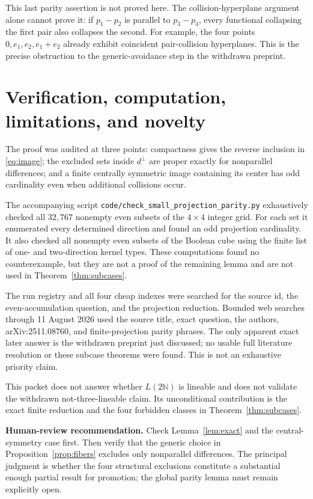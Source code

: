 \documentclass[11pt]{article}
\newcommand{\N}{\mathbb N}
\begin{document}
This last parity assertion is not proved here.  The collision-hyperplane
argument alone cannot prove it: if $p_1-p_2$ is parallel to $p_3-p_4$, every
functional collapsing the first pair also collapses the second.  For example,
the four points $0,e_1,e_2,e_1+e_2$ already exhibit coincident pair-collision
hyperplanes.  This is the precise obstruction to the generic-avoidance step
in the withdrawn preprint.

\section{Verification, computation, limitations, and novelty}

The proof was audited at three points: compactness gives the reverse inclusion
in \eqref{eq:image}; the excluded sets inside $d^\perp$ are proper exactly for
nonparallel differences; and a finite centrally symmetric image containing
its center has odd cardinality even when additional collisions occur.

The accompanying script \texttt{code/check\_small\_projection\_parity.py}
exhaustively checked all $32{,}767$ nonempty even subsets of the $4\times4$
integer grid.  For each set it enumerated every determined direction and
found an odd projection cardinality.  It also checked all nonempty even
subsets of the Boolean cube using the finite list of one- and two-direction
kernel types.  These computations found no counterexample, but they are not
a proof of the remaining lemma and are not used in Theorem~\ref{thm:subcases}.

The run registry and all four cheap indexes were searched for the source id,
the even-accumulation question, and the projection reduction.  Bounded web
searches through 11 August 2026 used the source title, exact question, the
authors, arXiv:2511.08760, and finite-projection parity phrases.  The only
apparent exact later answer is the withdrawn preprint just discussed; no
usable full literature resolution or these subcase theorems were found.  This
is not an exhaustive priority claim.

This packet does not answer whether $L(2\N)$ is lineable and does not validate
the withdrawn not-three-lineable claim.  Its unconditional contribution is
the exact finite reduction and the four forbidden classes in
Theorem~\ref{thm:subcases}.

\textbf{Human-review recommendation.} Check Lemma~\ref{lem:exact} and the
central-symmetry case first.  Then verify that the generic choice in
Proposition~\ref{prop:fibers} excludes only nonparallel differences.  The
principal judgment is whether the four structural exclusions constitute a
substantial enough partial result for promotion; the global parity lemma must
remain explicitly open.
\end{document}
